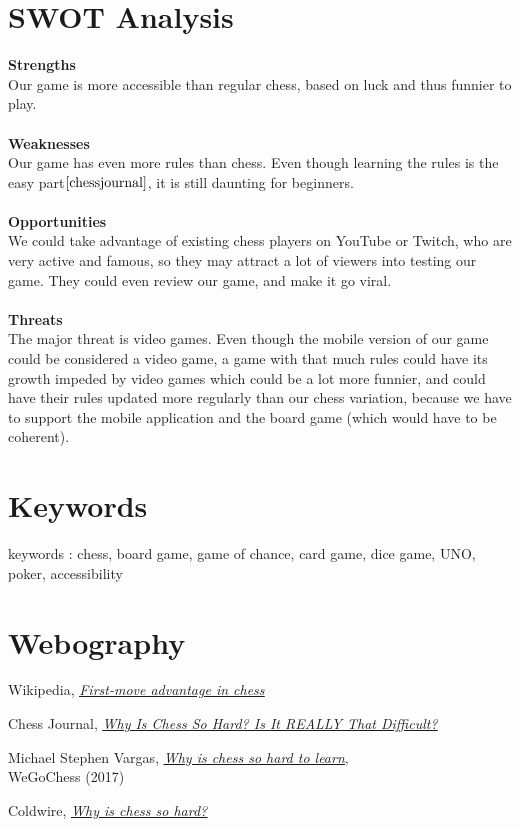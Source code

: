 \documentclass[12pt]{article}
\begin{document}
    
    \section{SWOT Analysis}
    \textbf{Strengths}
    \\Our game is more accessible than regular chess, based on luck and thus funnier to play.
    \\\\\textbf{Weaknesses}
    \\Our game has even more rules than chess. Even though learning the rules is the easy part$\cite{chessjournal}$, it is still daunting for beginners.
    \\\\\textbf{Opportunities}
    \\We could take advantage of existing chess players on YouTube or Twitch, who are very active and famous, so they may attract a lot of viewers into testing our game. They could even review our game, and make it go viral.
    \\\\\textbf{Threats} 
    \\The major threat is video games. Even though the mobile version of our game could be considered a video game, a game with that much rules could have its growth impeded by video games which could be a lot more funnier, and could have their rules updated more regularly than our chess variation, because we have to support the mobile application and the board game (which would have to be coherent).

    \section{Keywords}
        keywords : chess, board game, game of chance, card game, dice game, UNO, poker, accessibility
    
    \section{Webography}
        \begin{thebibliography}{9}
                Wikipedia, \textit{\href{https://en.wikipedia.org/wiki/First-move_advantage_in_chess}{\underline{First-move advantage in chess}} }
                
                Chess Journal, \textit{\href{https://www.chessjournal.com/why-is-chess-so-hard/}{\underline{Why Is Chess So Hard? Is It REALLY That Difficult?}} }
            
                Michael Stephen Vargas, \href{
        https://wegochess.com/why-is-chess-so-hard-to-learn/}{\underline{\textit{Why is chess so hard to learn}}},
                \\WeGoChess (2017)
            
                Coldwire,
                \href{https://www.thecoldwire.com/why-is-chess-so-hard/}{\underline{\textit{Why is chess so hard?}}}
        \end{thebibliography}
\end{document}
